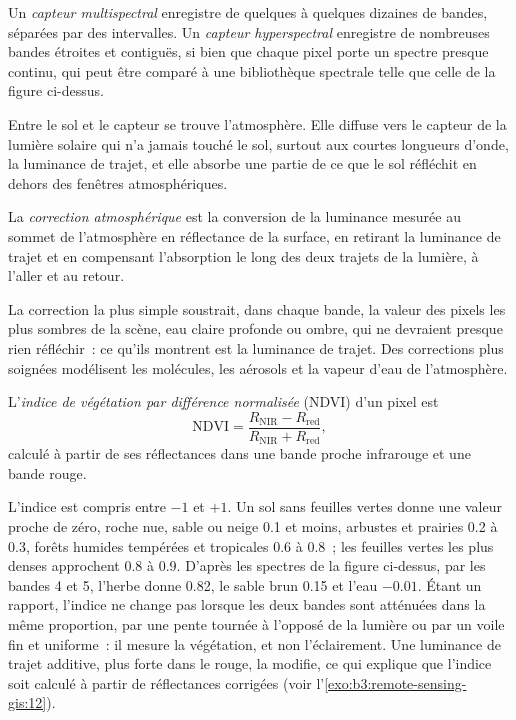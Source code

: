 \begin{definition}\label{def:b3:remote-sensing-gis:sensors}
Un \emph{capteur multispectral} enregistre de quelques
à quelques dizaines de bandes, séparées par des intervalles. Un \emph{capteur
hyperspectral} enregistre de nombreuses bandes étroites et contiguës,
si bien que chaque pixel porte un spectre presque continu, qui peut être
comparé à une bibliothèque spectrale telle que celle de la figure ci-dessus.
\end{definition}

Entre le sol et le capteur se trouve l'atmosphère. Elle diffuse
vers le capteur de la lumière solaire qui n'a jamais touché le sol, surtout aux
courtes longueurs d'onde, la luminance de trajet, et elle absorbe une partie de ce que le
sol réfléchit en dehors des fenêtres atmosphériques.

\begin{definition}\label{def:b3:remote-sensing-gis:atm-correction}
La \emph{correction atmosphérique} est la
conversion de la luminance mesurée au sommet de l'atmosphère en
réflectance de la surface, en retirant la luminance de trajet et en compensant
l'absorption le long des deux trajets de la lumière, à l'aller et au retour.
\end{definition}

La correction la plus simple soustrait, dans chaque bande, la valeur des
pixels les plus sombres de la scène, eau claire profonde ou ombre, qui ne devraient
presque rien réfléchir~: ce qu'ils montrent est la luminance de trajet. Des corrections
plus soignées modélisent les molécules, les aérosols et la vapeur d'eau de l'atmosphère.

\begin{definition}\label{def:b3:remote-sensing-gis:ndvi}
L'\emph{indice de végétation par différence
normalisée} (NDVI) d'un pixel est
\[
\mathrm{NDVI} = \frac{R_\mathrm{NIR} - R_\mathrm{red}}{R_\mathrm{NIR} + R_\mathrm{red}} ,
\]
calculé à partir de ses réflectances dans une bande proche infrarouge et une bande rouge.
\end{definition}

L'indice est compris entre $-1$ et $+1$. Un sol sans feuilles vertes donne une
valeur proche de zéro, roche nue, sable ou neige \num{0.1} et moins,
arbustes et prairies 0.2 à 0.3, forêts humides tempérées et tropicales 0.6 à
0.8~; les feuilles vertes les plus denses approchent 0.8 à 0.9. D'après les spectres de la
figure ci-dessus, par les bandes 4 et 5, l'herbe donne 0.82, le sable brun
0.15 et l'eau $-0.01$. Étant un rapport, l'indice ne change pas lorsque
les deux bandes sont atténuées dans la même proportion, par une pente tournée à l'opposé de
la lumière ou par un voile fin et uniforme~: il mesure la végétation, et non
l'éclairement. Une luminance de trajet additive, plus forte dans le rouge, la modifie,
ce qui explique que l'indice soit calculé à partir de réflectances corrigées
(voir l'\cref{exo:b3:remote-sensing-gis:12}).

